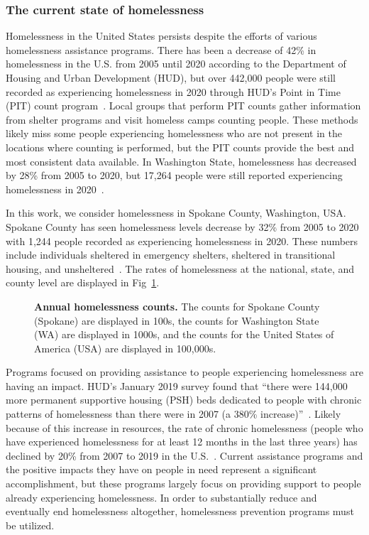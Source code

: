 \documentclass[10pt,letterpaper]{article}
\begin{document}
\subsubsection*{The current state of homelessness}
Homelessness in the United States persists despite the efforts of various homelessness assistance programs. There has been a decrease of 42\% in homelessness in the U.S. from 2005 until 2020 according to the Department of Housing and Urban Development (HUD), but over 442,000 people were still recorded as experiencing homelessness in 2020 through HUD's Point in Time (PIT) count program~\cite{PITcount}. Local groups that perform PIT counts gather information from shelter programs and visit homeless camps counting people. These methods likely miss some people experiencing homelessness who are not present in the locations where counting is performed, but the PIT counts provide the best and most consistent data available. In Washington State, homelessness has decreased by 28\% from 2005 to 2020, but 17,264 people were still reported experiencing homelessness in 2020~\cite{PITcount}.

In this work, we consider homelessness in Spokane County, Washington, USA.  Spokane County has seen homelessness levels decrease by 32\% from 2005 to 2020 with 1,244 people recorded as experiencing homelessness in 2020. These numbers include individuals sheltered in emergency shelters, sheltered in transitional housing, and unsheltered~\cite{PITcount}. The rates of homelessness at the national, state, and county level are displayed in Fig~\ref{fig:homelessness_counts}.

\begin{figure}[!h]
    \centering
    \caption{{\bf Annual homelessness counts.} The counts for Spokane County (Spokane) are displayed in 100s, the counts for Washington State (WA) are displayed in 1000s, and the counts for the United States of America (USA) are displayed in 100,000s.~\cite{PITcount}}
    \label{fig:homelessness_counts}
\end{figure}

Programs focused on providing assistance to people experiencing homelessness are having an impact. HUD's January 2019 survey found that ``there were 144,000 more permanent supportive housing (PSH) beds dedicated to people with chronic patterns of homelessness than there were in 2007 (a 380\% increase)''~\cite{2019AHAR}. Likely because of this increase in resources, the rate of chronic homelessness (people who have experienced homelessness for at least 12 months in the last three years) has declined by 20\% from 2007 to 2019 in the U.S.~\cite{2019AHAR}. Current assistance programs and the positive impacts they have on people in need represent a significant accomplishment, but these programs largely focus on providing support to people already experiencing homelessness. In order to substantially reduce and eventually end homelessness altogether, homelessness prevention programs must be utilized. 
\end{document}

